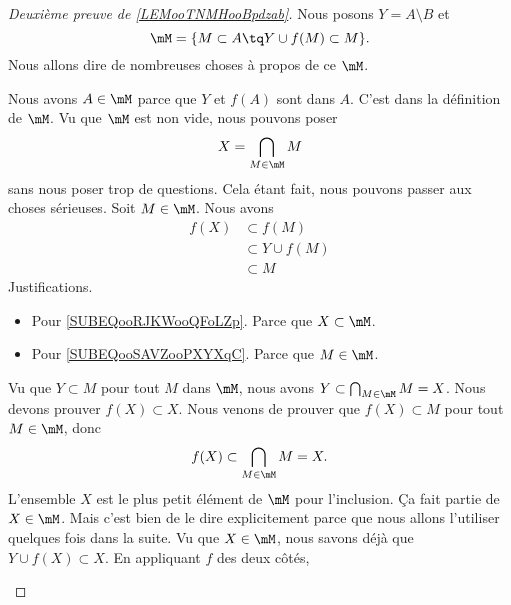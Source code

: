 \begin{proof}[Deuxième preuve de \ref{LEMooTNMHooBpdzab}\cite{BIBooZFPUooIiywbk}]
	Nous posons \( Y=A\setminus B\) et
	\begin{equation}
		\mM=\{ M\subset A\tq Y\cup f(M)\subset M \}.
	\end{equation}
	Nous allons dire de nombreuses choses à propos de ce \( \mM\).
	\begin{subproof}
		Nous avons \( A\in \mM\) parce que \( Y\) et \( f(A)\) sont dans \( A\).
		C'est dans la définition de \( \mM\).
		Vu que \( \mM\) est non vide, nous pouvons poser
		\begin{equation}
			X=\bigcap_{M\in \mM}M
		\end{equation}
		sans nous poser trop de questions. Cela étant fait, nous pouvons passer aux choses sérieuses.
		Soit \( M\in \mM\). Nous avons
		\begin{subequations}
			\begin{align}
				f(X) & \subset f(M)       \label{SUBEQooRJKWooQFoLZp}     \\
				     & \subset Y\cup f(M)                                 \\
				     & \subset M              \label{SUBEQooSAVZooPXYXqC}
			\end{align}
		\end{subequations}
		Justifications.
		\begin{itemize}
			\item Pour \eqref{SUBEQooRJKWooQFoLZp}. Parce que \( X\subset \mM\).
			\item Pour \eqref{SUBEQooSAVZooPXYXqC}. Parce que \( M\in \mM\).
		\end{itemize}
		\spitem[\( X\in\mM\)]
		Vu que \( Y\subset M\) pour tout \( M\) dans \( \mM\), nous avons \( Y\subset \bigcap_{M\in \mM}M=X\). Nous devons prouver \( f(X)\subset X\). Nous venons de prouver que \( f(X)\subset M\) pour tout \( M\in \mM\), donc
		\begin{equation}
			f(X)\subset \bigcap_{M\in\mM}M=X.
		\end{equation}
		L'ensemble \( X\) est le plus petit élément de \( \mM\) pour l'inclusion.
		Ça fait partie de \( X\in \mM\). Mais c'est bien de le dire explicitement parce que nous allons l'utiliser quelques fois dans la suite.
		\spitem[\( Y\cup f(X)\in\mM\)]
		Vu que \( X\in\mM\), nous savons déjà que \( Y\cup f(X)\subset X\). En appliquant \( f\) des deux côtés,

\end{subproof}
\end{proof}

